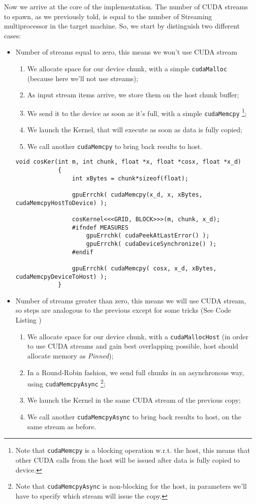	Now we arrive at the core of the implementation. The number of CUDA streams to spawn, as we previously told, is equal to the number of Streaming multiprocessor in the target machine. So, we start by distinguish two different cases:
	\begin{itemize}
		\item Number of streams equal to zero, this means we won't use CUDA stream
		\begin{enumerate}
			\item We allocate space for our device chunk, with a simple \texttt{cudaMalloc} (because here we'll not use streams);
			\item As input stream items arrive, we store them on the host chunk buffer;
			\item We send it to the device as soon as it's full, with a simple \texttt{cudaMemcpy} \footnote{Note that \texttt{cudaMemcpy} is a blocking operation w.r.t. the host, this means that other CUDA calls from the host will be issued after data is fully copied to device.};
			\item We launch the Kernel, that will execute as soon as data is fully copied;
			\item We call another \texttt{cudaMemcpy} to bring back results to host.
		\end{enumerate}
		
			\begin{lstlisting}[label=lst:noStr]
			void cosKer(int m, int chunk, float *x, float *cosx, float *x_d)
			{   
				int xBytes = chunk*sizeof(float);
				
				gpuErrchk( cudaMemcpy(x_d, x, xBytes, cudaMemcpyHostToDevice) ); 
				
				cosKernel<<<GRID, BLOCK>>>(m, chunk, x_d);
				#ifndef MEASURES
					gpuErrchk( cudaPeekAtLastError() );
					gpuErrchk( cudaDeviceSynchronize() );
				#endif   
				
				gpuErrchk( cudaMemcpy( cosx, x_d, xBytes, cudaMemcpyDeviceToHost) );
			}
			\end{lstlisting}
		
		\item Number of streams greater than zero, this means we will use CUDA stream, so steps are analogous to the previous except for some tricks (See Code Listing )
		\begin{enumerate}
			\item We allocate space for our device chunk, with a \texttt{cudaMallocHost} (in order to use CUDA streams and gain best overlapping possible, host should allocate memory as \textit{Pinned});
			\item In a Round-Robin fashion, we send full chunks in an asynchronous way, using \texttt{cudaMemcpyAsync} \footnote{Note that \texttt{cudaMemcpyAsync} is non-blocking for the host, in parameters we'll have to specify which stream will issue the copy.};
			\item We launch the Kernel in the same CUDA stream of the previous copy;
			\item We call another \texttt{cudaMemcpyAsync} to bring back results to host, on the same stream as before.
		\end{enumerate}
		

\end{itemize}
